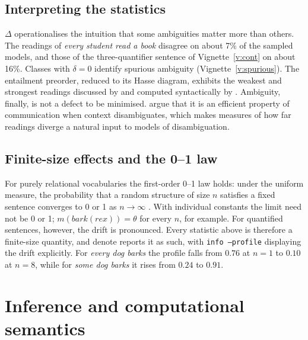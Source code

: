 \documentclass[11pt,a4paper]{article}
\newcommand{\dn}{\textsf{denote}}
\theoremstyle{definition}
\begin{document}
\subsection{Interpreting the statistics}
$\Delta$ operationalises the intuition that some ambiguities matter more than others. The readings of \textit{every student read a book} disagree on about 7\% of the sampled models, and those of the three-quantifier sentence of Vignette~\ref{v:cont} on about 16\%. Classes with $\delta=0$ identify spurious ambiguity (Vignette~\ref{v:spurious}). The entailment preorder, reduced to its Hasse diagram, exhibits the weakest and strongest readings discussed by \citet{kempsoncormack1981} and computed syntactically by \citet{kollerthater2010}. Ambiguity, finally, is not a defect to be minimised. \citet{piantadosietal2012} argue that it is an efficient property of communication when context disambiguates, which makes measures of how far readings diverge a natural input to models of disambiguation.

\subsection{Finite-size effects and the 0--1 law}
For purely relational vocabularies the first-order 0--1 law holds: under the uniform measure, the probability that a random structure of size $n$ satisfies a fixed sentence converges to 0 or 1 as $n\to\infty$ \citep{glebskiietal1969,fagin1976}. With individual constants the limit need not be 0 or 1; $m(\textit{bark}(\textit{rex}))=\theta$ for every $n$, for example. For quantified sentences, however, the drift is pronounced. Every statistic above is therefore a finite-size quantity, and \dn{} reports it as such, with \texttt{info --profile} displaying the drift explicitly. For \textit{every dog barks} the profile falls from $0.76$ at $n=1$ to $0.10$ at $n=8$, while for \textit{some dog barks} it rises from $0.24$ to $0.91$.

\section{Inference and computational semantics}\label{sec:inference}
\end{document}

